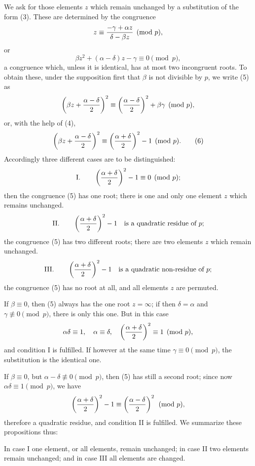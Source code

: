 \documentclass[11pt]{article}
\begin{document}
We ask for those elements $z$ which remain unchanged by a substitution of the form (3). These are determined by the congruence
\[
 z\equiv {-\gamma+\alpha z\over \delta-\beta z}\pmod p,
\]
or
\begin{equation}
 \beta z^2+(\alpha-\delta)z-\gamma\equiv0\pmod p,
\tag{5}
\end{equation}
a congruence which, unless it is identical, has at most two incongruent roots. To obtain these, under the supposition first that $\beta$ is not divisible by $p$, we write (5) as
\[
 \left(\beta z+{\alpha-\delta\over2}\right)^2
 \equiv \left({\alpha-\delta\over2}\right)^2+\beta\gamma\pmod p,
\]
or, with the help of (4),
\begin{equation}
 \left(\beta z+{\alpha-\delta\over2}\right)^2
 \equiv \left({\alpha+\delta\over2}\right)^2-1\pmod p.
\tag{6}
\end{equation}
Accordingly three different cases are to be distinguished:
\[
\text{I.}\qquad
 \left({\alpha+\delta\over2}\right)^2-1\equiv0\pmod p;
\]
then the congruence (5) has one root; there is one and only one element $z$ which remains unchanged.
\[
\text{II.}\qquad
 \left({\alpha+\delta\over2}\right)^2-1
\quad\text{is a quadratic residue of }p;
\]
the congruence (5) has two different roots; there are two elements $z$ which remain unchanged.
\[
\text{III.}\qquad
 \left({\alpha+\delta\over2}\right)^2-1
\quad\text{is a quadratic non-residue of }p;
\]
the congruence (5) has no root at all, and all elements $z$ are permuted.

If $\beta\equiv0$, then (5) always has the one root $z=\infty$; if then $\delta=\alpha$ and $\gamma\not\equiv0\pmod p$, there is only this one. But in this case
\[
 \alpha\delta\equiv1,
 \quad \alpha\equiv\delta,
 \quad \left({\alpha+\delta\over2}\right)^2\equiv1\pmod p,
\]
and condition I is fulfilled. If however at the same time $\gamma\equiv0\pmod p$, the substitution is the identical one.

If $\beta\equiv0$, but $\alpha-\delta\not\equiv0\pmod p$, then (5) has still a second root; since now $\alpha\delta\equiv1\pmod p$, we have
\[
 \left({\alpha+\delta\over2}\right)^2-1
 \equiv \left({\alpha-\delta\over2}\right)^2\pmod p,
\]
therefore a quadratic residue, and condition II is fulfilled. We summarize these propositions thus:

In case I one element, or all elements, remain unchanged; in case II two elements remain unchanged; and in case III all elements are changed.
\end{document}

